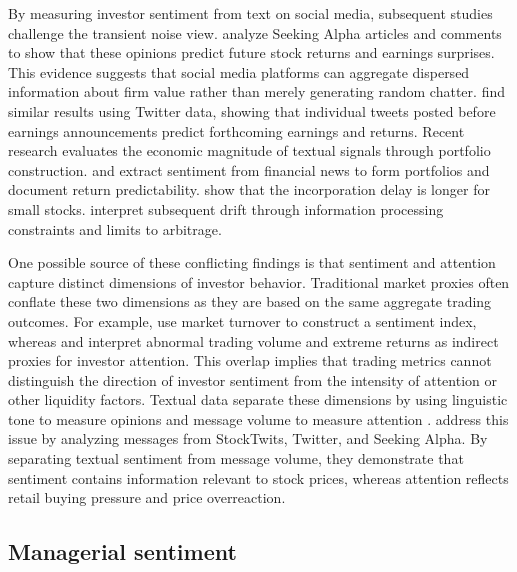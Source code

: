 \documentclass[12pt]{article}
\begin{document}
By measuring investor sentiment from text on social media, subsequent studies challenge the transient noise view. \citet{chen2014} analyze Seeking Alpha articles and comments to show that these opinions predict future stock returns and earnings surprises. This evidence suggests that social media platforms can aggregate dispersed information about firm value rather than merely generating random chatter. \citet{bartov2018} find similar results using Twitter data, showing that individual tweets posted before earnings announcements predict forthcoming earnings and returns. Recent research evaluates the economic magnitude of textual signals through portfolio construction. \citet{ke2021predicting} and \citet{lopez2023chatgpt} extract sentiment from financial news to form portfolios and document return predictability. \citet{ke2021predicting} show that the incorporation delay is longer for small stocks. \citet{lopez2023chatgpt} interpret subsequent drift through information processing constraints and limits to arbitrage.

One possible source of these conflicting findings is that sentiment and attention capture distinct dimensions of investor behavior. Traditional market proxies often conflate these two dimensions as they are based on the same aggregate trading outcomes. For example, \citet{baker2006} use market turnover to construct a sentiment index, whereas \citet{barber2008} and \citet{da2011} interpret abnormal trading volume and extreme returns as indirect proxies for investor attention. This overlap implies that trading metrics cannot distinguish the direction of investor sentiment from the intensity of attention or other liquidity factors. Textual data separate these dimensions by using linguistic tone to measure opinions and message volume to measure attention \citep{antweiler2004}. \citet{cookson2024} address this issue by analyzing messages from StockTwits, Twitter, and Seeking Alpha. By separating textual sentiment from message volume, they demonstrate that sentiment contains information relevant to stock prices, whereas attention reflects retail buying pressure and price overreaction.

\subsection{Managerial sentiment}
\end{document}
